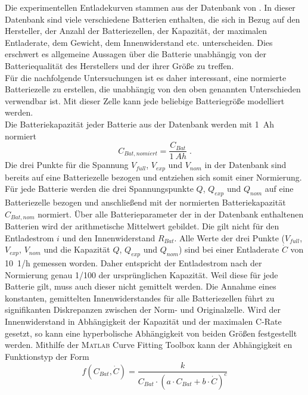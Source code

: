 Die experimentellen Entladekurven stammen aus der Datenbank von . In dieser Datenbank sind viele verschiedene Batterien enthalten, die sich in Bezug auf den Hersteller, der Anzahl der Batteriezellen, der Kapazität, der maximalen Entladerate, dem Gewicht, dem Innenwiderstand etc. unterscheiden. Dies erschwert es allgemeine Aussagen über die Batterie unabhängig von der Batteriequalität des Herstellers und der ihrer Größe zu treffen. \\
Für die nachfolgende Untersuchungen ist es daher interessant, eine normierte Batteriezelle zu erstellen, die unabhängig von den oben genannten Unterschieden verwendbar ist. Mit dieser Zelle kann jede beliebige Batteriegröße modelliert werden. \\
Die Batteriekapazität jeder Batterie aus der Datenbank werden mit \SI{1}{Ah} normiert
\begin{equation}
	C_{Bat,nomiert} = \frac{C_{Bat}}{\SI{1}{Ah}}\; .
\end{equation} 
Die drei Punkte für die Spannung \ensuremath{V_{full}}, \ensuremath{V_{exp}} und \ensuremath{V_{nom}} in der Datenbank sind bereits auf eine Batteriezelle bezogen und entziehen sich somit einer Normierung. 
Für jede Batterie werden die drei Spannungspunkte \ensuremath{Q}, \ensuremath{Q_{exp}} und \ensuremath{Q_{nom}} auf eine Batteriezelle bezogen und anschließend mit der normierten Batteriekapazität \ensuremath{C_{Bat,nom}} normiert. 
Über alle Batterieparameter der in der Datenbank enthaltenen Batterien wird der arithmetische Mittelwert gebildet. 
Die gilt nicht für den Entladestrom \ensuremath{i} und den Innenwiderstand \ensuremath{R_{Bat}}. Alle Werte der drei Punkte (\ensuremath{V_{full}}, \ensuremath{V_{exp}}, \ensuremath{V_{nom}} und die Kapazität \ensuremath{Q}, \ensuremath{Q_{exp}} und \ensuremath{Q_{nom}}) sind bei einer Entladerate \ensuremath{\dot{C}} von \SI{10}{1/h} gemessen worden. Daher entspricht der Entladestrom nach der Normierung genau 1/100 der ursprünglichen Kapazität.
Weil diese für jede Batterie gilt, muss auch dieser nicht gemittelt werden. 
Die Annahme eines konstanten, gemittelten Innenwiderstandes für alle Batteriezellen führt zu signifikanten Diskrepanzen zwischen der Norm- und Originalzelle. 
Wird der Innenwiderstand in Abhängigkeit der Kapazität und der maximalen C-Rate gesetzt, so kann eine hyperbolische Abhängigkeit von beiden Größen festgestellt werden. 
Mithilfe der \textsc{Matlab} Curve Fitting Toolbox kann der Abhängigkeit en Funktionstyp der Form
\begin{equation}
	f(C_{Bat},\dot{C}) = \frac{k}{C_{Bat}\cdot(a\cdot C_{Bat}+b\cdot \dot{C})^c}
\end{equation}
